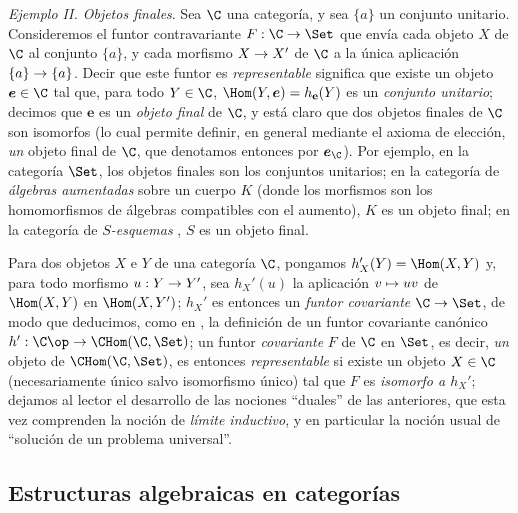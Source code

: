 \documentclass[oneside]{amsart}
\makeatletter
\newcommand{\ega@arrow}[2]{\mathchoice{#1}{#2}{#2}{#2}}
\let\ega@shortmapsto\mapsto
\renewcommand{\to}{\ega@arrow{\longrightarrow}{\rightarrow}}
\renewcommand{\mapsto}{\ega@arrow{\longmapsto}{\ega@shortmapsto}}
\let\EGAOriginalLabel\label
\renewcommand{\label}[1]{\phantomsection\EGAOriginalLabel{#1}}
\makeatother
\begin{document}
\begin{env}[8.1.10]
\label{0.8.1.10}
\textit{Ejemplo II. Objetos finales}.
Sea $\C$ una categoría, y sea $\{a\}$ un conjunto unitario.
Consideremos el funtor contravariante $F:\C\to\Set$ que envía cada objeto $X$ de $\C$ al conjunto $\{a\}$, y cada morfismo $X\to X'$ de $\C$ a la única aplicación $\{a\}\to\{a\}$.
Decir que este funtor es \emph{representable} significa que existe un objeto $\boldsymbol e\in\C$ tal que, para todo $Y\in\C$, $\Hom(Y,\boldsymbol e)=h_{\mathbf{e}}(Y)$ es un \emph{conjunto unitario}; decimos que $\boldsymbol e$ es un \emph{objeto final} de $\C$, y está claro que dos objetos finales de $\C$ son isomorfos (lo cual permite definir, en general mediante el axioma de elección, \emph{un} objeto final de $\C$, que denotamos entonces por $\boldsymbol e_\C$).
Por ejemplo, en la categoría $\Set$, los objetos finales son los conjuntos unitarios; en la categoría de \emph{álgebras aumentadas} sobre un cuerpo $K$ (donde los morfismos son los homomorfismos de álgebras compatibles con el aumento), $K$ es un objeto final; en la categoría de \emph{$S$-esquemas} , $S$ es un objeto final.
\end{env}

\begin{env}[8.1.11]
\label{0.8.1.11}
Para dos objetos $X$ e $Y$ de una categoría $\C$, pongamos $h_X'(Y)=\Hom(X,Y)$ y, para todo morfismo $u:Y\to Y'$, sea $h_X'(u)$ la aplicación $v\mapsto uv$ de $\Hom(X,Y)$ en $\Hom(X,Y')$; $h_X'$ es entonces un \emph{funtor covariante $\C\to\Set$}, de modo que deducimos, como en , la definición de un funtor covariante canónico $h':\C\op\to\CHom(\C,\Set)$; un funtor \emph{covariante} $F$ de $\C$ en $\Set$, es decir, \emph{un} objeto de $\CHom(\C,\Set)$, es entonces \emph{representable} si existe un objeto $X\in\C$ (necesariamente único salvo isomorfismo único) tal que $F$ es \emph{isomorfo a $h_X'$}; dejamos al lector el desarrollo de las nociones ``duales'' de las anteriores, que esta vez comprenden la noción de \emph{límite inductivo}, y en particular la noción usual de ``solución de un problema universal''.
\end{env}

\subsection{Estructuras algebraicas en categorías}
\label{subsection:0.8.2}
\end{document}
